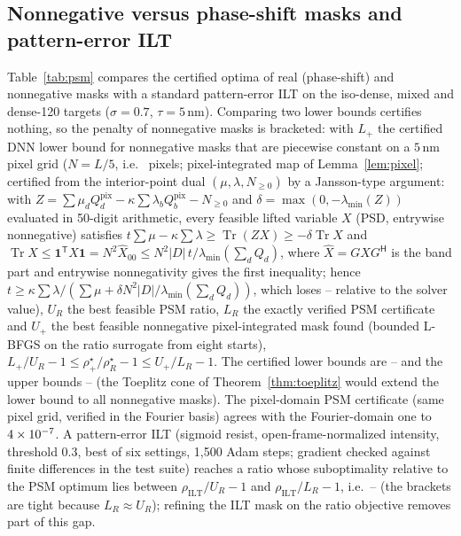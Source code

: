 \documentclass[11pt,a4paper]{article}
\newcommand{\SI}[2]{\ensuremath{#1\,\mathrm{#2}}}\newcommand{\SIrange}[3]{\ensuremath{#1\text{--}#2\,\mathrm{#3}}}
\theoremstyle{remark}\newtheorem*{remark}{Remark}
\DeclareMathOperator{\Tr}{Tr}\DeclareMathOperator{\rank}{rank}\DeclareMathOperator{\conj}{conj}
\begin{document}
\subsection{Nonnegative versus phase-shift masks and pattern-error ILT}
Table~\ref{tab:psm} compares the certified optima of real (phase-shift) and nonnegative masks with a standard pattern-error ILT on the iso-dense, mixed and dense-120 targets ($\sigma=0.7$, $\tau=\SI{5}{nm}$). Comparing two lower bounds certifies nothing, so the penalty of nonnegative masks is bracketed: with $L_+$ the certified DNN lower bound for nonnegative masks that are piecewise constant on a \SI{5}{nm} pixel grid ($N=L/5$, i.e.\ \psmPixelN{} pixels; pixel-integrated map of Lemma~\ref{lem:pixel}; certified from the interior-point dual $(\mu,\lambda,N_{\ge0})$ by a Jansson-type argument: with $Z=\sum\mu_dQ^{\mathrm{pix}}_d-\kappa\sum\lambda_bQ^{\mathrm{pix}}_b-N_{\ge0}$ and $\delta=\max(0,-\lambda_{\min}(Z))$ evaluated in 50-digit arithmetic, every feasible lifted variable $X$ (PSD, entrywise nonnegative) satisfies $t\sum\mu-\kappa\sum\lambda\ge\Tr(ZX)\ge-\delta\Tr X$ and $\Tr X\le\mathbf 1^{\mathsf T}X\mathbf 1=N^2\hat X_{00}\le N^2|D|\,t/\lambda_{\min}(\sum_dQ_d)$, where $\hat X=GXG^{\mathsf H}$ is the band part and entrywise nonnegativity gives the first inequality; hence $t\ge\kappa\sum\lambda/(\sum\mu+\delta N^2|D|/\lambda_{\min}(\sum_dQ_d))$, which loses \dnnLossLo--\dnnLossHi{} relative to the solver value), $U_R$ the best feasible PSM ratio, $L_R$ the exactly verified PSM certificate and $U_+$ the best feasible nonnegative pixel-integrated mask found (bounded L-BFGS on the ratio surrogate from eight starts), $L_+/U_R-1\le\rho^\star_+/\rho^\star_R-1\le U_+/L_R-1$. The certified lower bounds are \binPenLo--\binPenHi{} and the upper bounds \binPenHiLo--\binPenHiHi{} (the Toeplitz cone of Theorem~\ref{thm:toeplitz} would extend the lower bound to all nonnegative masks). The pixel-domain PSM certificate (same pixel grid, verified in the Fourier basis) agrees with the Fourier-domain one to $4\times10^{-7}$. A pattern-error ILT (sigmoid resist, open-frame-normalized intensity, threshold 0.3, best of six settings, 1,500 Adam steps; gradient checked against finite differences in the test suite) reaches a ratio whose suboptimality relative to the PSM optimum lies between $\rho_{\mathrm{ILT}}/U_R-1$ and $\rho_{\mathrm{ILT}}/L_R-1$, i.e.\ \iltPsmLo--\iltPsmHi{} (the brackets are tight because $L_R\approx U_R$); refining the ILT mask on the ratio objective removes part of this gap.
\end{document}
